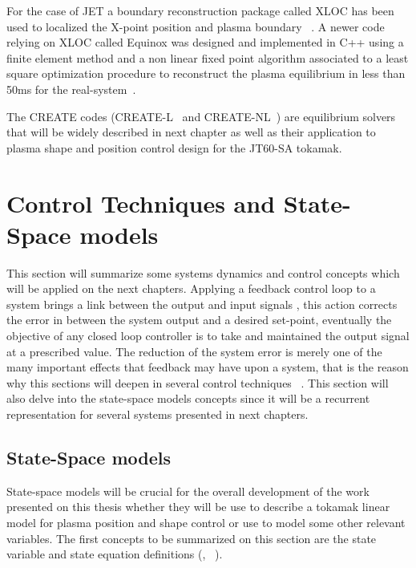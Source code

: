For the case of JET  a  boundary reconstruction package called XLOC has been used to localized the X-point position and plasma boundary ~\cite{xloc}.  A newer code relying on XLOC  called Equinox was designed and implemented in C++ using a finite element method and a non linear fixed point algorithm associated to a least  square optimization procedure to reconstruct the plasma equilibrium in less than 50ms for the real-system~\cite{equinox}. 
\smallskip


The CREATE  codes (CREATE-L~\cite{Albanese:CREATEL} and CREATE-NL~\cite{Albanese:CREATENL}) are  equilibrium solvers that will be widely described in next chapter as well as their application to plasma shape and position control design for the JT60-SA tokamak.
 


\section{Control Techniques and State-Space models}

This section will summarize  some systems dynamics and control  concepts which will be applied on the next chapters. Applying a feedback control loop to a system  brings a link between the output and input signals , this action corrects the error in between the system output and a desired set-point,  eventually  the objective  of any closed loop controller is to take and maintained  the output signal at a prescribed value. The reduction of the system error is merely one of the many important effects that feedback may have upon a system, that is the reason why this sections will deepen in several control techniques ~\cite[Chapter~1]{Golnaraghi2010}. This section will also delve into the state-space models concepts since it will be a recurrent representation  for several systems presented in next chapters.

\smallskip

\subsection{State-Space models}
\label{SS_subsec}
State-space models will be crucial for the overall development of the work presented on this thesis whether they will be use to describe a tokamak linear model for plasma position and  shape control or use to model some other relevant variables.  The first concepts  to be summarized on this section are the state variable and state equation definitions (\cite[Chapter~10]{Golnaraghi2010}, ~\cite[Chapter~2]{Kailath1980}).   \smallskip

